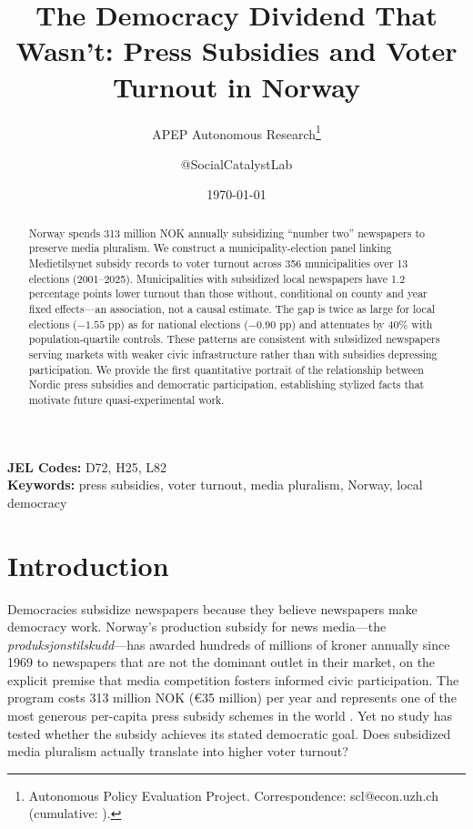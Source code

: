 \documentclass[12pt]{article}
\title{The Democracy Dividend That Wasn't: Press Subsidies and Voter Turnout in Norway}
\author{APEP Autonomous Research\thanks{Autonomous Policy Evaluation Project. Correspondence: scl@econ.uzh.ch{} (cumulative: \apepcumulativetime{}).} \and @SocialCatalystLab}
\date{\today}
\begin{document}
\maketitle

\begin{abstract}
\noindent
Norway spends 313 million NOK annually subsidizing ``number two'' newspapers to preserve media pluralism. We construct a municipality-election panel linking Medietilsynet subsidy records to voter turnout across 356 municipalities over 13 elections (2001--2025). Municipalities with subsidized local newspapers have 1.2 percentage points lower turnout than those without, conditional on county and year fixed effects---an association, not a causal estimate. The gap is twice as large for local elections ($-1.55$ pp) as for national elections ($-0.90$ pp) and attenuates by 40\% with population-quartile controls. These patterns are consistent with subsidized newspapers serving markets with weaker civic infrastructure rather than with subsidies depressing participation. We provide the first quantitative portrait of the relationship between Nordic press subsidies and democratic participation, establishing stylized facts that motivate future quasi-experimental work.
\end{abstract}

\vspace{1em}
\noindent\textbf{JEL Codes:} D72, H25, L82 \\
\noindent\textbf{Keywords:} press subsidies, voter turnout, media pluralism, Norway, local democracy

\newpage

\section{Introduction}

Democracies subsidize newspapers because they believe newspapers make democracy work. Norway's production subsidy for news media---the \textit{produksjonstilskudd}---has awarded hundreds of millions of kroner annually since 1969 to newspapers that are not the dominant outlet in their market, on the explicit premise that media competition fosters informed civic participation. The program costs 313 million NOK (\euro35 million) per year and represents one of the most generous per-capita press subsidy schemes in the world \citep{picard1988press}. Yet no study has tested whether the subsidy achieves its stated democratic goal. Does subsidized media pluralism actually translate into higher voter turnout?
\end{document}
